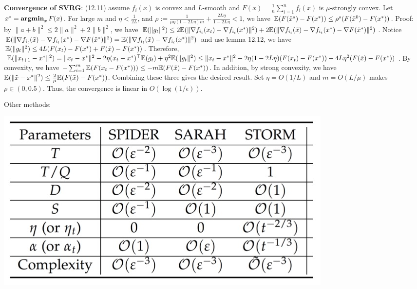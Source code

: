 \textbf{Convergence of SVRG}: (12.11) assume $f_i(x)$ is convex and $L$-smooth and $F(x)=\frac{1}{n}\sum_{i=1}^n f_i(x)$ is $\mu$-strongly convex. Let $x^*=\operatorname{\textbf{argmin}}_x F(x)$. For large $m$ and $\eta < \frac{1}{2L}$, and $\rho:=\frac{1}{\mu\eta(1-2L\eta)m}+\frac{2L\eta}{1-2L\eta} < 1$, we have $\mathbb{E}(F(\tilde{x}^s) - F(x^*)) \le \rho^s(F(\tilde{x}^0) - F(x^*))$. Proof: by $\|a+b\|^2\le 2\|a\|^2+2\|b\|^2$, we have $\mathbb{E}(\|g_t\|^2) \le 2\mathbb{E}(\|\nabla f_{i_t}(x_{t}) - \nabla f_{i_t}(x^*)\|^2) + 2\mathbb{E}(\|\nabla f_{i_t}(\tilde{x}) - \nabla f_{i_t}(x^*) - \nabla F(\tilde{x}^*)\|^2)$. Notice $\mathbb{E}(\|\nabla f_{i_t}(\tilde{x}) - \nabla f_{i_t}(x^*) - \nabla F(\tilde{x}^*)\|^2) = \mathbb{E}(\|\nabla f_{i_t}(\tilde{x}) - \nabla f_{i_t}(x^*)\|^2)$ and use lemma 12.12, we have $\mathbb{E}(\|g_t\|^2) \le 4L(F(x_{t}) - F(x^*) + F(\tilde{x}) - F(x^*))$. Therefore, $\mathbb{E}(\|x_{t+1}-x^*\|^2) = \|x_t - x^*\|^2 - 2\eta(x_t - x^*)^\top \mathbb{E}(g_t) + \eta^2\mathbb{E}(\|g_t\|^2) \le \|x_t - x^*\|^2 -2\eta(1-2L\eta)(F(x_t) - F(x^*)) + 4L\eta^2(F(\tilde{x}) - F(x^*))$. By convexity, we have $-\sum_{i=1}^m \mathbb{E}(F(x_{t} - F(x^*))) \le -m \mathbb{E}(F(\tilde{x}) - F(x^*))$. In addition, by strong convexity, we have $\mathbb{E}(\|\tilde{x} - x^*\|^2) \le \frac{2}{\mu}\mathbb{E}(F(\tilde{x}) - F(x^*))$. Combining these three gives the desired result. Set $\eta=O(1/L)$ and $m=O(L/\mu)$ makes $\rho \in (0, 0.5)$. Thus, the convergence is linear in $O(\log(1/\epsilon))$.

Other methods: 

\includegraphics[width=\linewidth]{imgs/SGD-var.jpg}